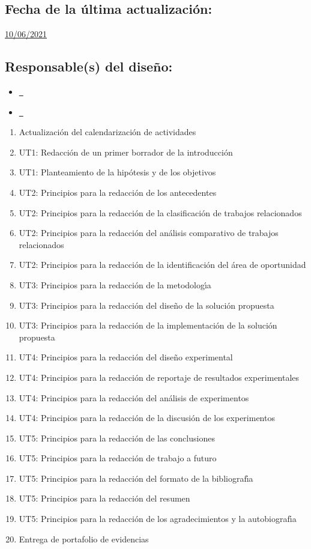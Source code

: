 \documentclass[10 pt]{article}
\begin{document}
\subsection{Fecha de la \'{u}ltima actualizaci\'{o}n:} \underline{10/06/2021}
\subsection{Responsable(s) del dise\~{n}o:}
\begin{itemize}[label={}]
\item \underline{\nroger~\roger}
\item \underline{\nelisa~\elisa}
\end{itemize}
\newpage



\begin{enumerate}[itemsep=-2pt]
\item Actualizaci\'{o}n del calendarizaci\'{o}n de actividades
\item UT1: Redacci\'{o}n de un  primer borrador de la introducci\'{o}n
\item UT1: Planteamiento de la hip\'{o}tesis y de los objetivos
\item UT2: Principios para la redacci\'{o}n de los antecedentes
\item UT2: Principios para la redacci\'{o}n de la clasificaci\'{o}n de trabajos relacionados
\item UT2: Principios para la redacci\'{o}n del an\'{a}lisis comparativo de trabajos relacionados
\item UT2: Principios para la redacci\'{o}n de la identificaci\'{o}n del \'{a}rea de oportunidad
\item UT3: Principios para la redacci\'{o}n de la metodolog\'{\i}a
\item UT3: Principios para la redacci\'{o}n del dise\~{n}o de la soluci\'{o}n propuesta
\item UT3: Principios para la redacci\'{o}n de la implementaci\'{o}n de la soluci\'{o}n propuesta
\item UT4: Principios para la redacci\'{o}n del dise\~{n}o experimental
\item UT4: Principios para la redacci\'{o}n de reportaje de resultados experimentales
\item UT4: Principios para la redacci\'{o}n del an\'{a}lisis de experimentos
\item UT4: Principios para la redacci\'{o}n de la discusi\'{o}n de los experimentos
\item UT5: Principios para la redacci\'{o}n de las conclusiones
\item UT5: Principios para la redacci\'{o}n de trabajo a futuro
\item UT5: Principios para la redacci\'{o}n del formato de la bibliograf\'{\i}a
\item UT5: Principios para la redacci\'{o}n del resumen
\item UT5: Principios para la redacci\'{o}n de los agradecimientos y la autobiograf\'{\i}a
\item Entrega de portafolio de evidencias
\end{enumerate}
\end{document}
